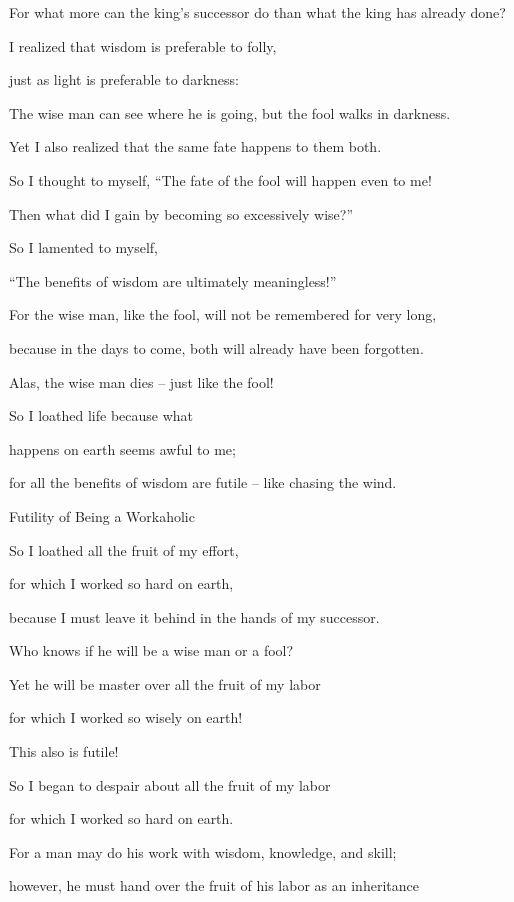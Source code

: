 {\par }{\Q For
what
more can the king’s successor
do
than what the king
has already
done?
\par }{\Q {}I
realized
that wisdom
is
preferable
to folly,
\par }{\Q just
as light
is preferable
to darkness:
\par }{\Q {}The wise
man can see
where he is going, but the fool
walks
in darkness.
\par }{\Q Yet I
also
realized
that the same
fate
happens to them both.
\par }{\Q {}So I thought
to myself,
“The fate
of the fool
will happen
even
to me!

\par }{\Q Then what
did I
gain by becoming
so excessively wise?”

\par }{\Q So I
lamented to myself,

\par }{\Q “The benefits
of wisdom
are ultimately meaningless!”
\par }{\Q {}For
the wise
man, like the fool,
will not
be
remembered
for very long,
\par }{\Q because in the days
to come,
both will already
have been forgotten.
\par }{\Q Alas,
the wise
man dies
– just like the fool!
\par }{\Q {}So I loathed
life
because
what
\par }{\Q happens
on
earth
seems awful
to me;
\par }{\Q for
all
the benefits of wisdom are futile
– like chasing
the wind.
\par }{\SH Futility of Being a Workaholic
\par }{\Q {}So I
loathed
all
the fruit of my effort,
\par }{\Q for which I
worked
so hard on earth,
\par }{\Q because I must leave
it behind
in the hands of my successor.
\par }{\Q {}Who
knows
if he will be a wise man
or
a fool?
\par }{\Q Yet he will be master over
all
the fruit of my labor
\par }{\Q for which I worked
so wisely
on
earth!

\par }{\Q This
also
is futile!
\par }{\Q {}So
I
began to despair
about all
the fruit
of my labor
\par }{\Q for which I worked
so hard
on earth.
\par }{\Q {}For
a man
may do
his work
with wisdom,
knowledge,
and skill;
\par }{\Q however, he must hand over
the fruit of his labor
as an inheritance

}
